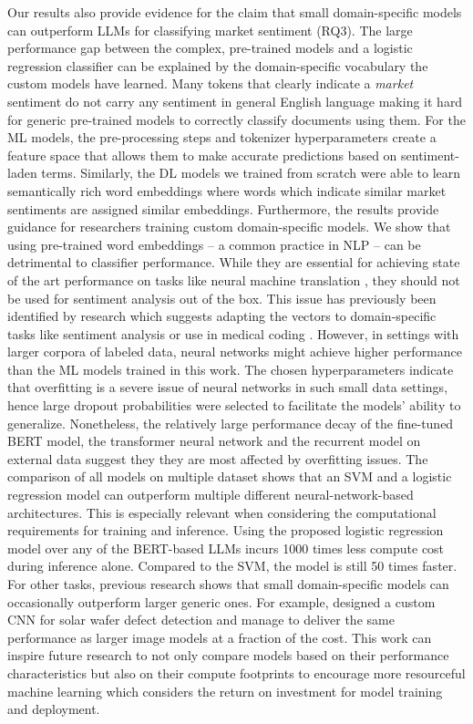 Our results also provide evidence for the claim that small domain-specific models can outperform LLMs for classifying market sentiment (RQ3). The large performance gap between the complex, pre-trained models and a logistic regression classifier can be explained by the domain-specific vocabulary the custom models have learned. Many tokens that clearly indicate a \emph{market} sentiment do not carry any sentiment in general English language making it hard for generic pre-trained models to correctly classify documents using them.  For the ML models, the pre-processing steps and tokenizer hyperparameters create a feature space that allows them to make accurate predictions based on sentiment-laden terms. Similarly, the DL models we trained from scratch were able to learn semantically rich word embeddings where words which indicate similar market sentiments are assigned similar embeddings. Furthermore, the results provide guidance for researchers training custom domain-specific models. We show that using pre-trained word embeddings -- a common practice in NLP -- can be detrimental to classifier performance. While they are essential for achieving state of the art performance on tasks like neural machine translation , they should not be used for sentiment analysis out of the box. This issue has previously been identified by research which suggests adapting the vectors to domain-specific tasks like sentiment analysis  or use in medical coding .\newline
However, in settings with larger corpora of labeled data, neural networks might achieve higher performance than the ML models trained in this work. The chosen hyperparameters indicate that overfitting is a severe issue of neural networks in such small data settings, hence large dropout probabilities were selected to facilitate the models' ability to generalize. Nonetheless, the relatively large performance decay of the fine-tuned BERT model, the transformer neural network and the recurrent model on external data suggest they they are most affected by overfitting issues.
The comparison of all models on multiple dataset shows that an SVM and a logistic regression model can outperform multiple different neural-network-based architectures. This is especially relevant when considering the computational requirements for training and inference. Using the proposed logistic regression model over any of the BERT-based LLMs incurs 1000 times less compute cost during inference alone. Compared to the SVM, the model is still 50 times faster. For other tasks, previous research shows that small domain-specific models can occasionally outperform larger generic ones. For example,  designed a custom CNN for solar wafer defect detection and manage to deliver the same performance as larger image models at a fraction of the cost. This work can inspire future research to not only compare models based on their performance characteristics but also on their compute footprints to encourage more resourceful machine learning which considers the return on investment for model training and deployment.

